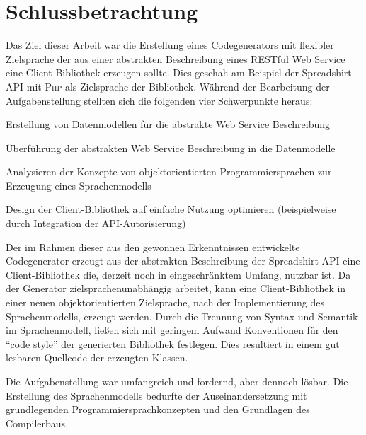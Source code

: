 \chapter{Schlussbetrachtung}
\label{chap:summary}


Das Ziel dieser Arbeit war die Erstellung eines Codegenerators mit flexibler Zielsprache der aus einer abstrakten Beschreibung eines \gls{RESTful} Web Service eine Client-Bibliothek erzeugen sollte. Dies geschah am Beispiel der Spreadshirt-\gls{API} mit \textsc{Php} als Zielsprache der Bibliothek. 
Während der Bearbeitung der Aufgabenstellung stellten sich die folgenden vier Schwerpunkte heraus:
\begin{compactitem}
    \item Erstellung von Datenmodellen für die abstrakte Web Service Beschreibung
    \item Überführung der abstrakten Web Service Beschreibung in die Datenmodelle
    \item Analysieren der Konzepte von objektorientierten Programmiersprachen zur Erzeugung eines Sprachenmodells
    \item Design der Client-Bibliothek auf einfache Nutzung optimieren (beispielweise durch Integration der \gls{API}-Autorisierung)
\end{compactitem}

Der im Rahmen dieser \thesisDesignator{} aus den gewonnen Erkenntnissen entwickelte Codegenerator erzeugt aus der abstrakten Beschreibung der Spreadshirt-\gls{API} eine Client-Bibliothek die, derzeit noch in eingeschränktem Umfang, nutzbar ist. Da der Generator zielsprachenunabhängig arbeitet, kann eine Client-Bibliothek in einer neuen objektorientierten Zielsprache, nach der Implementierung des Sprachenmodells, erzeugt werden. Durch die Trennung von Syntax und Semantik im Sprachenmodell, ließen sich mit geringem Aufwand Konventionen für den \enquote{code style} der generierten Bibliothek festlegen. Dies resultiert in einem gut lesbaren Quellcode der erzeugten Klassen.

Die Aufgabenstellung war umfangreich und fordernd, aber dennoch lösbar. Die Erstellung des Sprachenmodells bedurfte der Auseinandersetzung mit grundlegenden Programmiersprachkonzepten und den Grundlagen des Compilerbaus.


